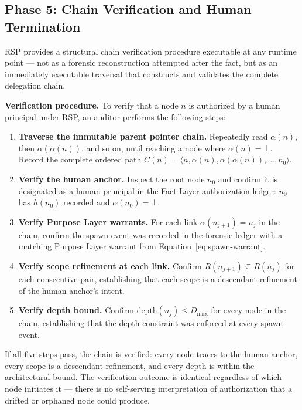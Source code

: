 \subsection{Phase 5: Chain Verification and Human Termination}
\label{sec:rs-verification}

RSP provides a structural chain verification procedure executable at any runtime point — not as a forensic reconstruction attempted after the fact, but as an immediately executable traversal that constructs and validates the complete delegation chain.

\medskip
\noindent\textbf{Verification procedure.} To verify that a node $n$ is authorized by a human principal under RSP, an auditor performs the following steps:

\begin{enumerate}
    \item[(V1)] \textbf{Traverse the immutable parent pointer chain.} Repeatedly read $\alpha(n)$, then $\alpha(\alpha(n))$, and so on, until reaching a node where $\alpha(n) = \bot$. Record the complete ordered path $C(n) = \langle n, \alpha(n), \alpha(\alpha(n)), \ldots, n_0 \rangle$.

    \item[(V2)] \textbf{Verify the human anchor.} Inspect the root node $n_0$ and confirm it is designated as a human principal in the Fact Layer authorization ledger: $n_0$ has $h(n_0)$ recorded and $\alpha(n_0) = \bot$.

    \item[(V3)] \textbf{Verify Purpose Layer warrants.} For each link $\alpha(n_{j+1}) = n_j$ in the chain, confirm the spawn event was recorded in the forensic ledger with a matching Purpose Layer warrant from Equation~\ref{eq:spawn-warrant}.

    \item[(V4)] \textbf{Verify scope refinement at each link.} Confirm $R(n_{j+1}) \subseteq R(n_j)$ for each consecutive pair, establishing that each scope is a descendant refinement of the human anchor's intent.

    \item[(V5)] \textbf{Verify depth bound.} Confirm $\text{depth}(n_j) \leq D_{\max}$ for every node in the chain, establishing that the depth constraint was enforced at every spawn event.
\end{enumerate}

If all five steps pass, the chain is verified: every node traces to the human anchor, every scope is a descendant refinement, and every depth is within the architectural bound. The verification outcome is identical regardless of which node initiates it — there is no self-serving interpretation of authorization that a drifted or orphaned node could produce.

